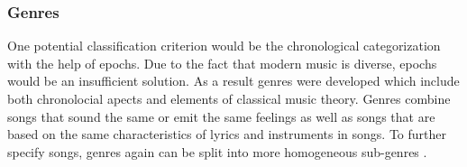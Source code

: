 


\subsubsection{Genres}

One potential classification criterion would be the chronological categorization with the help of epochs. 
Due to the fact that modern music is diverse, epochs would be an insufficient solution. As a result genres 
were developed which include both chronolocial apects and elements of classical music theory. Genres combine 
songs that sound the same or emit the same feelings as well as songs that are based on the same characteristics 
of lyrics and instruments in songs. To further specify songs, genres again can be split into more homogeneous 
sub-genres \cite{MusicflxRichtungen}. 



